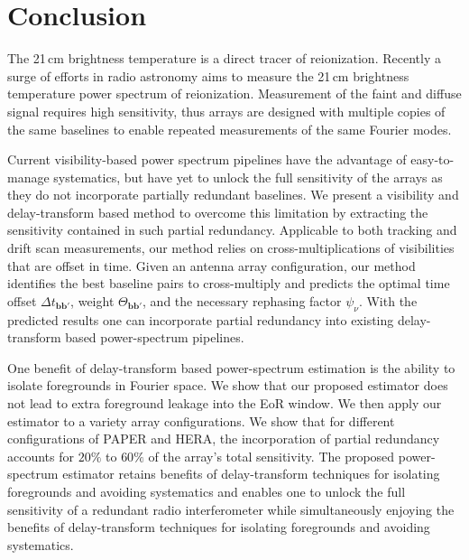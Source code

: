 \documentclass[twocolumn,apj,numberedappendix]{emulateapj}
\renewcommand\[{\begin{equation}}
\renewcommand\]{\end{equation}}
\begin{document}

\section{Conclusion}
The 21\,cm brightness temperature is a direct tracer of reionization. Recently a surge of efforts in radio astronomy aims to measure the 21\,cm brightness temperature power spectrum of reionization. Measurement of the faint and diffuse signal requires high sensitivity, thus arrays are designed with multiple copies of the same baselines to enable repeated measurements of the same Fourier modes. 
 
Current visibility-based power spectrum pipelines have the advantage of easy-to-manage systematics, but have yet to unlock the full sensitivity of the arrays as they do not incorporate partially redundant baselines.  We present a visibility and delay-transform based method to overcome this limitation by extracting the sensitivity contained in such partial redundancy. Applicable to both tracking and drift scan measurements, our method relies on cross-multiplications of visibilities that are offset in time. Given an antenna array configuration, our method identifies the best baseline pairs to cross-multiply and predicts the optimal time offset $\Delta t_{\boldsymbol{bb'}}$, weight $\Theta_{\boldsymbol{bb'}}$, and the necessary rephasing factor $\psi_\nu$. With the predicted results one can incorporate partial redundancy into existing delay-transform based power-spectrum pipelines. 

One benefit of delay-transform based power-spectrum estimation is the ability to isolate foregrounds in Fourier space. We show that our proposed estimator does not lead to extra foreground leakage into the EoR window. We then apply our estimator to a variety array configurations. We show that for different configurations of PAPER and HERA, the incorporation of partial redundancy accounts for $20\%$ to $60\%$ of the array's total sensitivity. The proposed power-spectrum estimator retains benefits of delay-transform techniques for isolating foregrounds and avoiding systematics and enables one to unlock the full sensitivity of a redundant radio interferometer while simultaneously enjoying the benefits of delay-transform techniques for isolating foregrounds and avoiding systematics. 
\end{document}

